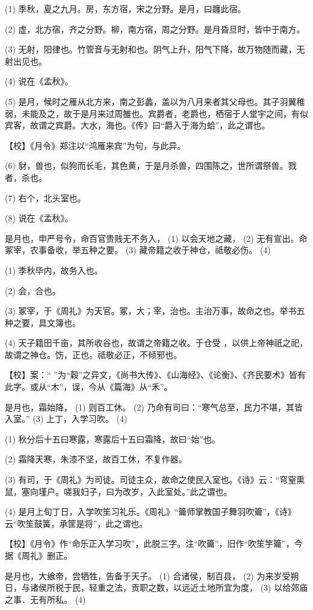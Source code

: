 \documentclass[12pt,UTF8]{ctexbook}
\begin{document}
(1) 季秋，夏之九月。房，东方宿，宋之分野。是月，曰躔此宿。

(2) 虚，北方宿，齐之分野。柳，南方宿，周之分野。是月昏旦时，皆中于南方。

(3) 无射，阳律也。竹管音与无射和也。阴气上升，阳气下降，故万物随而藏，无射出见也。

(4) 说在《孟秋》。

(5) 是月，候时之雁从北方来，南之彭蠡，盖以为八月来者其父母也。其子羽翼稚弱，未能及之，故于是月来过周雒也。宾爵者，老爵也，栖宿于人堂宇之间，有似宾客，故谓之宾爵。大水，海也。《传》曰“爵入于海为蛤”，此之谓也。

【校】《月令》郑注以“鸿雁来宾”为句，与此异。

(6) 豺，兽也，似狗而长毛，其色黄，于是月杀兽，四围陈之，世所谓祭兽。戮者，杀也。

(7) 右个，北头室也。

(8) 说在《孟秋》。

是月也，申严号令，命百官贵贱无不务入， (1) 以会天地之藏， (2) 无有宣出。命冢宰，农事备收，举五种之要。 (3) 藏帝籍之收于神仓，祗敬必伤。 (4)

(1) 季秋毕内，故务入也。

(2) 会，合也。

(3) 冢宰，于《周礼》为天官。冢，大；宰，治也。主治万事，故命之也。举书五种之要，具文簿也。

(4) 天子籍田千亩，其所收谷也，故谓之帝籍之收。于仓受 ，以供上帝神祇之祀，故谓之神仓。饬，正也。祗敬必正，不倾邪也。

【校】案：“ ”为“穀”之异文，《尚书大传》、《山海经》、《论衡》、《齐民要术》皆有此字。或从“木”，误，今从《篇海》从“禾”。

是月也，霜始降， (1) 则百工休。 (2) 乃命有司曰：“寒气总至，民力不堪，其皆入室。” (3) 上丁，入学习吹。 (4)

(1) 秋分后十五曰寒露，寒露后十五曰霜降，故曰“始”也。

(2) 霜降天寒，朱漆不坚，故百工休，不复作器。

(3) 有司，于《周礼》为司徒。司徒主众，故命之使民入室也。《诗》云：“穹窒熏鼠，塞向墐户。嗟我妇子，曰为改岁，入此室处。”此之谓也。

(4) 是月上旬丁日，入学吹笙习礼乐。《周礼》“籥师掌教国子舞羽吹籥”，《诗》云“吹笙鼓簧，承筐是将”，此之谓也。

【校】《月令》作“命乐正入学习吹”，此脱三字。注“吹籥”，旧作“吹笙竽籥”，今据《周礼》删正。

是月也，大飨帝，尝牺牲，告备于天子。 (1) 合诸侯，制百县， (2) 为来岁受朔日，与诸侯所税于民，轻重之法，贡职之数，以远近土地所宜为度， (3) 以给郊庙之事．无有所私。 (4)
\end{document}
